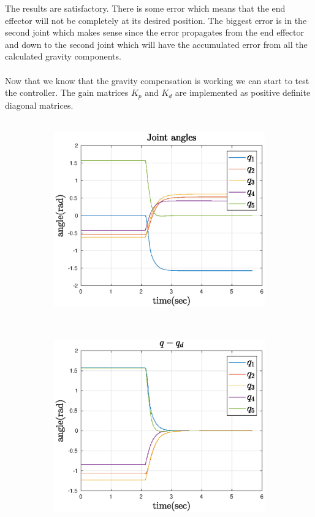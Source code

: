 The results are satisfactory. There is some error which means that the end effector will not be completely at its desired position. The biggest error is in the second joint which makes sense since the error propagates from the end effector and down to the second joint which will have the accumulated error from all the calculated gravity components.\\\\
Now that we know that the gravity compensation is working we can start to test the controller. The gain matrices $K_p$ and $K_d$ are implemented as positive definite diagonal matrices.\\\\
\def\picsSiz{1.08}
\begin{figure}[htbp]
    \centering
    \begin{subfigure}[htbp]{0.45\textwidth}
        \centering
        \includegraphics[width = \picsSiz\linewidth]{img/LSq.eps}
        \caption{ }
        \label{fig:LSq}
    \end{subfigure}
    ~ 
    \begin{subfigure}[htbp]{0.45\textwidth}
        \centering
        \includegraphics[width = \picsSiz\linewidth]{img/LSerror.eps}

\end{subfigure}
\end{figure}
